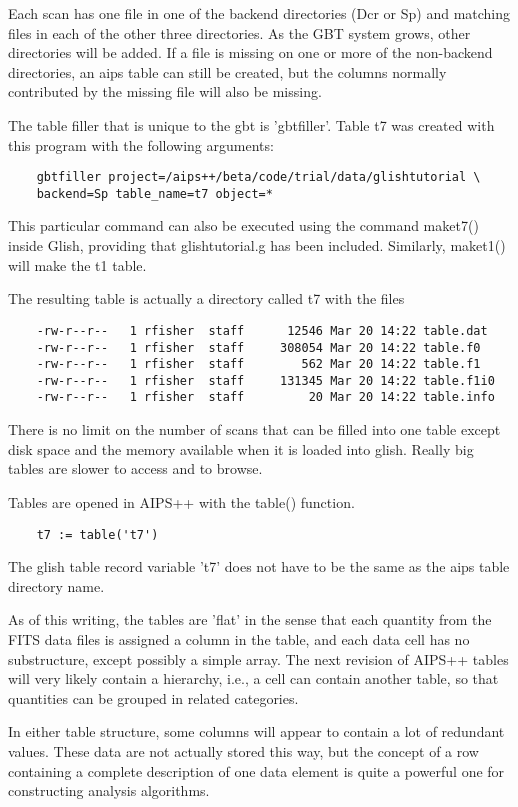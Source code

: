     Each scan has one file in one of the backend directories (Dcr or Sp)
and matching files in each of the other three directories.  As the GBT
system grows, other directories will be added.  If a file is missing on one
or more of the non-backend directories, an aips table can still be created,
but the columns normally contributed by the missing file will also be
missing.

    The table filler that is unique to the gbt is 'gbtfiller'.  Table t7
was created with this program with the following arguments:

\begin{verbatim}
	gbtfiller project=/aips++/beta/code/trial/data/glishtutorial \
	backend=Sp table_name=t7 object=*
\end{verbatim}

This particular command can also be executed using the command maket7()
inside Glish, providing that glishtutorial.g has been
included. Similarly, maket1() will make the t1 table.

The resulting table is actually a directory called t7 with the files

\begin{verbatim}
	-rw-r--r--   1 rfisher  staff      12546 Mar 20 14:22 table.dat
	-rw-r--r--   1 rfisher  staff     308054 Mar 20 14:22 table.f0
	-rw-r--r--   1 rfisher  staff        562 Mar 20 14:22 table.f1
	-rw-r--r--   1 rfisher  staff     131345 Mar 20 14:22 table.f1i0
	-rw-r--r--   1 rfisher  staff         20 Mar 20 14:22 table.info
\end{verbatim}

There is no limit on the number of scans that can be filled into one table
except disk space and the memory available when it is loaded into glish.
Really big tables are slower to access and to browse.

    Tables are opened in AIPS++ with the table() function.

\begin{verbatim}
	t7 := table('t7')
\end{verbatim}

The glish table record variable 't7' does not have to be the same as the
aips table directory name.

    As of this writing, the tables are 'flat' in the sense that each
quantity from the FITS data files is assigned a column in the table, and
each data cell has no substructure, except possibly a simple array.  The
next revision of AIPS++ tables will very likely contain a hierarchy, i.e.,
a cell can contain another table, so that quantities can be grouped in
related categories.

    In either table structure, some columns will appear to contain a lot of
redundant values.  These data are not actually stored this way, but the
concept of a row containing a complete description of one data element is
quite a powerful one for constructing analysis algorithms.

